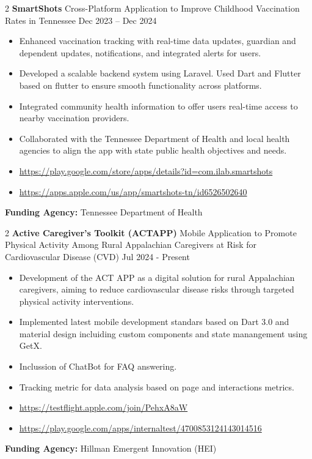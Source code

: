 \documentclass[10pt, letterpaper]{article}
\newenvironment{highlights}{
    \begin{itemize}[
        topsep=0.10 cm,
        parsep=0.10 cm,
        partopsep=0pt,
        itemsep=0pt,
        leftmargin=0 cm + 10pt
    ]
}{
    \end{itemize}
} %
\newenvironment{twocolentry}[2][]{
    \onecolentry
    \def\secondColumn{#2}
    \setcolumnwidth{\fill, 4.5 cm}
    \begin{paracol}{2}
}{
    \switchcolumn \raggedleft \secondColumn
    \end{paracol}
    \endonecolentry
} %
\begin{document}
        \vspace{0.3cm} \begin{twocolentry}{Dec 2023 – Dec 2024} \textbf{SmartShots} \textbar Cross-Platform Application to Improve Childhood Vaccination Rates in Tennessee \end{twocolentry} \begin{highlights} 
            \item Enhanced vaccination tracking with real-time data updates, guardian and dependent updates, notifications, and integrated alerts for users. 
            \item Developed a scalable backend system using Laravel. Used Dart and Flutter based on flutter to ensure smooth functionality across platforms. 
            \item Integrated community health information to offer users real-time access to nearby vaccination providers.
             \item Collaborated with the Tennessee Department of Health and local health agencies to align the app with state public health objectives and needs. 
             \item \url{https://play.google.com/store/apps/details?id=com.ilab.smartshots}
             \item  \url{https://apps.apple.com/us/app/smartshots-tn/id6526502640} \end{highlights} \vspace{0.3cm} \noindent \textbf{Funding Agency:} Tennessee Department of Health
    
    \vspace{0.3cm} \begin{twocolentry}{Jul 2024 - Present} \textbf{Active Caregiver’s Toolkit (ACTAPP)} \textbar Mobile Application to Promote Physical Activity Among Rural Appalachian Caregivers at Risk for Cardiovascular Disease (CVD) \end{twocolentry} \begin{highlights} 
        \item Development of the ACT APP as a digital solution for rural Appalachian caregivers, aiming to reduce cardiovascular disease risks through targeted physical activity interventions. 
        \item Implemented latest mobile development standars based on Dart 3.0 and material design incluiding custom components and state manangement using GetX.
        \item Inclussion of ChatBot for FAQ answering.
        \item Tracking metric for data analysis based on page and interactions metrics.
        \item \url{https://testflight.apple.com/join/PehxA8aW} 
        \item \url{https://play.google.com/apps/internaltest/4700853124143014516}
    \end{highlights} \vspace{0.3cm} \noindent \textbf{Funding Agency:} Hillman Emergent Innovation (HEI)
\end{document}
